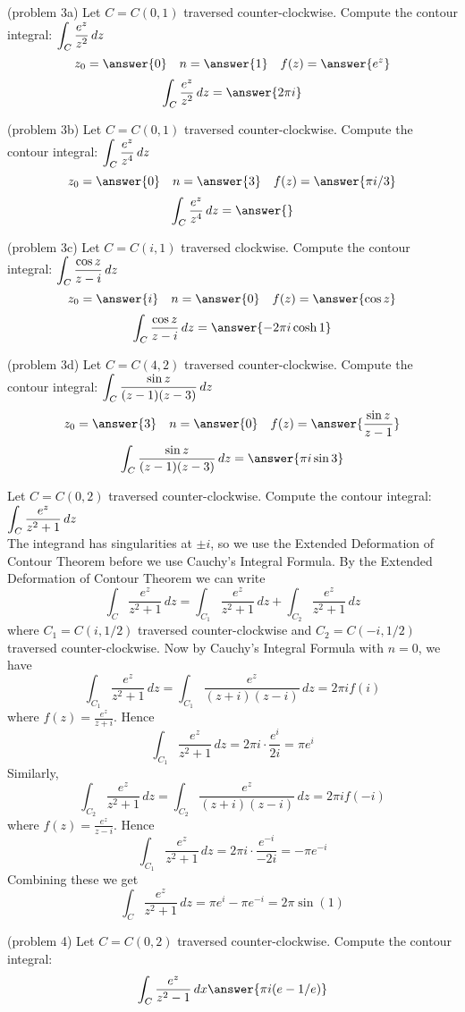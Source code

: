 \documentclass[handout]{ximera}
\begin{document}
\begin{problem}(problem 3a)
Let $C = C(0, 1)$ traversed counter-clockwise. Compute the contour integral: $\displaystyle \int_C \frac{e^z}{z^2} \, dz$\\
\[
z_0 = \answer{0} \quad n = \answer{1} \quad f(z) = \answer{e^z}
\]
\[
\int_C \frac{e^z}{z^2} \, dz = \answer{2\pi i}
\]
\end{problem}
\begin{problem}(problem 3b)
Let $C = C(0, 1)$ traversed counter-clockwise. Compute the contour integral: $\displaystyle \int_C \frac{e^z}{z^4} \, dz$\\
\[
z_0 = \answer{0} \quad n = \answer{3} \quad f(z) = \answer{\pi i /3}
\]
\[
\int_C \frac{e^z}{z^4}\, dz = \answer{}
\]
\end{problem}
\begin{problem}(problem 3c)
Let $C = C(i, 1)$ traversed clockwise. Compute the contour integral: $\displaystyle \int_C \frac{\cos z}{z-i} \, dz$\\
\[
z_0 = \answer{i} \quad n = \answer{0} \quad f(z) = \answer{\cos z}
\]
\[
\int_C \frac{\cos z}{z-i}\, dz = \answer{-2\pi i \cosh 1}
\]
\end{problem}
\begin{problem}(problem 3d)
Let $C = C(4, 2)$ traversed counter-clockwise. Compute the contour integral: $\displaystyle \int_C \frac{\sin z}{(z-1)(z-3)} \, dz$\\
\[
z_0 = \answer{3} \quad n = \answer{0} \quad f(z) = \answer{\frac{\sin z}{z-1}}
\]
\[
\int_C \frac{\sin z}{(z-1)(z-3)} \, dz = \answer{\pi i \sin 3}
\]
\end{problem}

\begin{example}[example 4]
Let $C = C(0, 2)$ traversed counter-clockwise. Compute the contour integral: $\displaystyle \int_C \frac{e^z}{z^2 +1} \, dz$\\
The integrand has singularities at $\pm i$, so we use the Extended Deformation of Contour Theorem before we use Cauchy's Integral Formula.
By the Extended Deformation of Contour Theorem we can write
\[
\int_C \frac{e^z}{z^2 +1} \, dz = \int_{C_1} \frac{e^z}{z^2 +1} \, dz +  \int_{C_2} \frac{e^z}{z^2 +1} \, dz 
\]
where $C_1 = C(i, 1/2)$ traversed counter-clockwise and $C_2 = C(-i, 1/2)$ traversed counter-clockwise.
Now by Cauchy's Integral Formula with $n = 0$, we have
\[
\int_{C_1} \frac{e^z}{z^2 +1} \, dz = \int_{C_1} \frac{e^z}{(z+i)(z-i)} \, dz = 2\pi i f(i)
\]
where $f(z) = \frac{e^z}{z+i}$.
Hence
\[
\int_{C_1} \frac{e^z}{z^2 +1} \, dz = 2\pi i \cdot \frac{e^i}{2i} = \pi e^i
\]
Similarly,
\[
\int_{C_2} \frac{e^z}{z^2 +1} \, dz = \int_{C_2} \frac{e^z}{(z+i)(z-i)} \, dz = 2\pi i f(-i)
\]
where $f(z) = \frac{e^z}{z-i}$.
Hence
\[
\int_{C_1} \frac{e^z}{z^2 +1} \, dz = 2\pi i \cdot \frac{e^{-i}}{-2i} = -\pi e^{-i}
\]
Combining these we get
\[
\int_C \frac{e^z}{z^2 +1} \, dz = \pi e^i - \pi e^{-i} = 2\pi \sin(1)
\]
\end{example}

\begin{problem}(problem 4)
Let $C = C(0, 2)$ traversed counter-clockwise. Compute the contour integral:\\
\[
\int_C \frac{e^z}{z^2 -1} \, dx  \answer{\pi i (e-1/e)}
\]
\end{problem}
\end{document}
